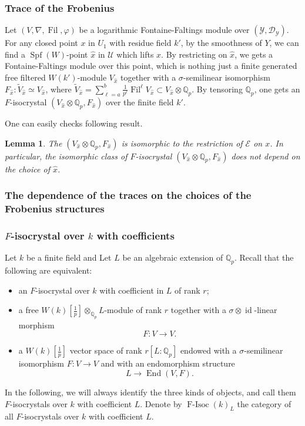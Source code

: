 \documentclass[12pt,twoside]{book}
\theoremstyle{plain}
\newtheorem{lemma}[lemma]{Lemma}
\theoremstyle{definition}
\theoremstyle{remark}
\newcommand{\bQ}{{\mathbb Q}}
\newcommand{\mD}{{\mathcal D}}
\newcommand{\mE}{{\mathcal E}}
\newcommand{\mU}{{\mathcal U}}
\newcommand{\mY}{{\mathcal Y}}
\DeclareMathOperator\End{End}
\DeclareMathOperator\Fil{Fil}
\DeclareMathOperator\id{id}
\DeclareMathOperator\Spf{Spf}
\DeclareMathOperator{\FIsoc}{F-Isoc}
\numberwithin{equation}{section}
\begin{document}
\subsubsection{Trace of the Frobenius}
Let $(V,\nabla,\Fil,\varphi)$ be a logarithmic Fontaine-Faltings module over $(\mY,\mD_\mY)$.
For any closed point $x$ in $U_1$ with residue field $k'$, by the smoothness of $Y$, we can find a $\Spf(W)$-point $\widehat{x}$ in $\mU$ which lifts $x$. By restricting on $\widehat{x}$, we gets a Fontaine-Faltings module over this point, which is nothing just a finite generated free filtered $W(k')$-module $V_{\widehat x}$ together with a $\sigma$-semilinear isomorphism $F_{\widehat x}\colon \widetilde{V}_{\widehat x}\simeq V_{\widehat x}$, where $\widetilde{V}_{\widehat x} = \sum\limits_{\ell = a}^{b} \frac1{p^\ell}\Fil^\ell V_{\widehat x} \subset V_{\widehat x} \otimes \bQ_p$. By tensoring $\bQ_p$, one gets an $F$-isocrystal $(V_{\widehat{x}}\otimes \bQ_p,F_{\widehat{x}})$ over the finite field $k'$.

One can easily checks following result.
\begin{lemma} The $(V_{\widehat{x}}\otimes \bQ_p,F_{\widehat{x}})$ is isomorphic to the restriction of $\mE$ on $x$. In particular, the isomorphic class of $F$-isocrystal $(V_{\widehat{x}}\otimes \bQ_p,F_{\widehat{x}})$ does not depend on the choice of $\widehat{x}$.
\end{lemma}


\subsubsection{The dependence of the traces on the choices of the Frobenius structures}

\subsubsection{$F$-isocrystal over $k$ with coefficients}

Let $k$ be a finite field and Let $L$ be an algebraic extension of $\bQ_p$. Recall that the following are equivalent:
\begin{itemize}
\item an $F$-isocrystal over $k$ with coefficient in $L$ of rank $r$;
\item a free $W(k)[\frac1p]\otimes_{\bQ_p} L$-module of rank $r$ together with a $\sigma\otimes \id$-linear morphism
\[F\colon V\rightarrow V.\]
\item a $W(k)[\frac1p]$ vector space of rank $r[L:\bQ_p]$ endowed with a $\sigma$-semilinear isomorphism $F\colon V\rightarrow V$ and with an endomorphism structure
\[L\rightarrow \End(V,F).\]
\end{itemize}
In the following, we will always identify the three kinds of objects, and call them $F$-isocrystals over $k$ with coefficient $L$. Denote by $\FIsoc(k)_L$ the category of all $F$-isocrystals over $k$ with coefficient $L$.
\end{document}
